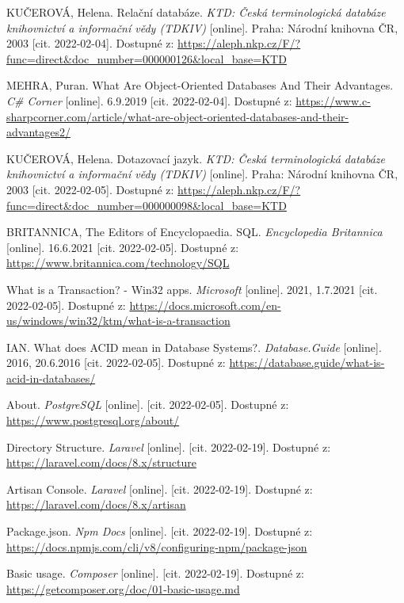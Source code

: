\begin{thebibliography}{55}
KUČEROVÁ, Helena. Relační databáze. \textit{KTD: Česká terminologická databáze knihovnictví a informační vědy (TDKIV)} [online]. Praha: Národní knihovna ČR, 2003 [cit. 2022-02-04]. Dostupné z: \url{https://aleph.nkp.cz/F/?func=direct&doc\_number=000000126&local\_base=KTD}

MEHRA, Puran. What Are Object-Oriented Databases And Their Advantages. \textit{C\# Corner} [online]. 6.9.2019 [cit. 2022-02-04]. Dostupné z: \url{https://www.c-sharpcorner.com/article/what-are-object-oriented-databases-and-their-advantages2/}

KUČEROVÁ, Helena. Dotazovací jazyk. \textit{KTD: Česká terminologická databáze knihovnictví a informační vědy (TDKIV)} [online]. Praha: Národní knihovna ČR, 2003 [cit. 2022-02-05]. Dostupné z: \url{https://aleph.nkp.cz/F/?func=direct&doc\_number=000000098&local\_base=KTD}

BRITANNICA, The Editors of Encyclopaedia. SQL. \textit{Encyclopedia Britannica} [online]. 16.6.2021 [cit. 2022-02-05]. Dostupné z: \url{https://www.britannica.com/technology/SQL}

What is a Transaction? - Win32 apps. \textit{Microsoft} [online]. 2021, 1.7.2021 [cit. 2022-02-05]. Dostupné z: \url{https://docs.microsoft.com/en-us/windows/win32/ktm/what-is-a-transaction}

IAN. What does ACID mean in Database Systems?. \textit{Database.Guide} [online]. 2016, 20.6.2016 [cit. 2022-02-05]. Dostupné z: \url{https://database.guide/what-is-acid-in-databases/}

About. \textit{PostgreSQL} [online]. [cit. 2022-02-05]. Dostupné z: \url{https://www.postgresql.org/about/}

Directory Structure. \textit{Laravel} [online]. [cit. 2022-02-19]. Dostupné z: \url{https://laravel.com/docs/8.x/structure}

Artisan Console. \textit{Laravel} [online]. [cit. 2022-02-19]. Dostupné z: \url{https://laravel.com/docs/8.x/artisan}

Package.json. \textit{Npm Docs} [online]. [cit. 2022-02-19]. Dostupné z: \url{https://docs.npmjs.com/cli/v8/configuring-npm/package-json}

Basic usage. \textit{Composer} [online]. [cit. 2022-02-19]. Dostupné z: \url{https://getcomposer.org/doc/01-basic-usage.md}


\end{thebibliography}
